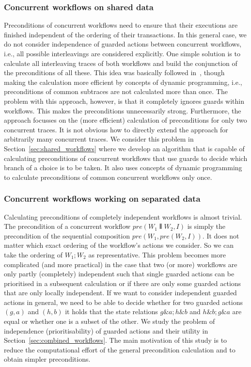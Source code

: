 \documentclass[11pt]{article}
\begin{document}
\subsubsection{Concurrent workflows on shared data}

Preconditions of concurrent workflows need to ensure that their executions are finished independent of the ordering of their transactions. In this general case, we do not consider independence of guarded actions between concurrent workflows, i.e., all possible interleavings are considered explicitly. One simple solution is to calculate all interleaving traces of both workflows and build the conjunction of the preconditions of all these. This idea was basically followed in~\cite{Wang2012}, though making the calculation more efficient by concepts of dynamic programming, i.e., preconditions of common subtraces are not calculated more than once. The problem with this approach, however, is that it completely ignores guards within workflows. This makes the preconditions unnecessarily strong. Furthermore, the approach focusses on the (more efficient) calculation of preconditions for only two concurrent traces. It is not obvious how to directly extend the approach for arbitrarily many concurrent traces. We consider this problem in Section~\ref{sec:shared_workflows} where we develop an algorithm that is capable of calculating preconditions of concurrent workflows that use guards to decide which branch of a choice is to be taken. It also uses concepts of dynamic programming to calculate preconditions of common concurrent workflows only once.

\subsubsection{Concurrent workflows working on separated data}

Calculating preconditions of completely independent workflows is almost trivial. The precondition of a concurrent workflow $pre(W_1 \interleave W_2,I)$ is simply the precondition of the sequential composition $pre(W_1,pre(W_2,I))$. It does not matter which exact ordering of the workflow's actions we consider. So we can take the ordering of $W_1 ; W_2$ as representative. This problem becomes more complicated (and more practical) in the case that two (or more) workflows are only partly (completely) independent such that single guarded actions can be prioritised in a subsequent calculation or if there are only some guarded actions that are only locally independent. If we want to consider independent guarded actions in general, we need to be able to decide whether for two guarded actions $(g,a)$ and $(h,b)$ it holds that the state relations $g \& a; h \& b$ and $h \& b ; g \& a$ are equal or whether one is a subset of the other. We study the problem of independence (prioritisability) of guarded actions and their utility in Section~\ref{sec:combined_workflows}. The main motivation of this study is to reduce the computational effort of the general precondition calculation and to obtain simpler preconditions.
\end{document}
